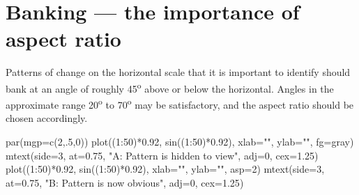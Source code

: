 \documentclass[
  10pt,
  b5paper]{book}
\newenvironment{Shaded}{\begin{snugshade}}{\end{snugshade}}
\newcommand{\AttributeTok}[1]{\textcolor[rgb]{0.77,0.63,0.00}{#1}}
\newcommand{\DecValTok}[1]{\textcolor[rgb]{0.00,0.00,0.81}{#1}}
\newcommand{\FloatTok}[1]{\textcolor[rgb]{0.00,0.00,0.81}{#1}}
\newcommand{\FunctionTok}[1]{\textcolor[rgb]{0.00,0.00,0.00}{#1}}
\newcommand{\NormalTok}[1]{#1}
\newcommand{\SpecialCharTok}[1]{\textcolor[rgb]{0.00,0.00,0.00}{#1}}
\newcommand{\StringTok}[1]{\textcolor[rgb]{0.31,0.60,0.02}{#1}}
\begin{document}
\hypertarget{banking-the-importance-of-aspect-ratio}{%
\section{Banking --- the importance of aspect ratio}\label{banking-the-importance-of-aspect-ratio}}

Patterns of change on the horizontal scale that it is
important to identify should bank at an angle of roughly 45\textsuperscript{o}
above or below the horizontal. Angles in
the approximate range 20\textsuperscript{o} to 70\textsuperscript{o} may be satisfactory,
and the aspect ratio should be chosen accordingly.

\enlargethispage{21pt}

\begin{Shaded}
\begin{Highlighting}[]
\FunctionTok{par}\NormalTok{(}\AttributeTok{mgp=}\FunctionTok{c}\NormalTok{(}\DecValTok{2}\NormalTok{,.}\DecValTok{5}\NormalTok{,}\DecValTok{0}\NormalTok{))}
\FunctionTok{plot}\NormalTok{((}\DecValTok{1}\SpecialCharTok{:}\DecValTok{50}\NormalTok{)}\SpecialCharTok{*}\FloatTok{0.92}\NormalTok{, }\FunctionTok{sin}\NormalTok{((}\DecValTok{1}\SpecialCharTok{:}\DecValTok{50}\NormalTok{)}\SpecialCharTok{*}\FloatTok{0.92}\NormalTok{), }\AttributeTok{xlab=}\StringTok{""}\NormalTok{, }\AttributeTok{ylab=}\StringTok{""}\NormalTok{, }\AttributeTok{fg=}\StringTok{\textquotesingle{}gray\textquotesingle{}}\NormalTok{)}
\FunctionTok{mtext}\NormalTok{(}\AttributeTok{side=}\DecValTok{3}\NormalTok{, }\AttributeTok{at=}\FloatTok{0.75}\NormalTok{, }\StringTok{"A: Pattern is hidden to view"}\NormalTok{, }\AttributeTok{adj=}\DecValTok{0}\NormalTok{, }\AttributeTok{cex=}\FloatTok{1.25}\NormalTok{)}
\FunctionTok{plot}\NormalTok{((}\DecValTok{1}\SpecialCharTok{:}\DecValTok{50}\NormalTok{)}\SpecialCharTok{*}\FloatTok{0.92}\NormalTok{, }\FunctionTok{sin}\NormalTok{((}\DecValTok{1}\SpecialCharTok{:}\DecValTok{50}\NormalTok{)}\SpecialCharTok{*}\FloatTok{0.92}\NormalTok{), }\AttributeTok{xlab=}\StringTok{""}\NormalTok{, }\AttributeTok{ylab=}\StringTok{""}\NormalTok{, }\AttributeTok{asp=}\DecValTok{2}\NormalTok{)}
\FunctionTok{mtext}\NormalTok{(}\AttributeTok{side=}\DecValTok{3}\NormalTok{, }\AttributeTok{at=}\FloatTok{0.75}\NormalTok{, }\StringTok{"B: Pattern is now obvious"}\NormalTok{, }\AttributeTok{adj=}\DecValTok{0}\NormalTok{, }\AttributeTok{cex=}\FloatTok{1.25}\NormalTok{)}
\end{Highlighting}
\end{Shaded}
\end{document}
